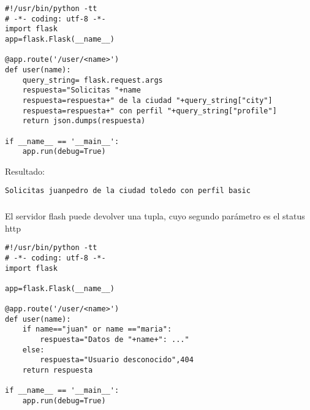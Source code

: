 \documentclass[ucs]{beamer}
\begin{document}
\begin{frame}[fragile]


  \begin{footnotesize}
  \begin{verbatim}
#!/usr/bin/python -tt
# -*- coding: utf-8 -*-
import flask
app=flask.Flask(__name__)

@app.route('/user/<name>') 
def user(name):
    query_string= flask.request.args
    respuesta="Solicitas "+name
    respuesta=respuesta+" de la ciudad "+query_string["city"]
    respuesta=respuesta+" con perfil "+query_string["profile"]
    return json.dumps(respuesta)

if __name__ == '__main__': 
    app.run(debug=True)
  \end{verbatim}
  \end{footnotesize}

Resultado:

  \begin{footnotesize}
  \begin{verbatim}
Solicitas juanpedro de la ciudad toledo con perfil basic
  \end{verbatim}
  \end{footnotesize}

\end{frame}


\begin{frame}[fragile]
\frametitle{}
El servidor flash puede devolver una tupla, cuyo segundo parámetro
es el status http

  \begin{footnotesize}
  \begin{verbatim}
#!/usr/bin/python -tt
# -*- coding: utf-8 -*-
import flask

app=flask.Flask(__name__)

@app.route('/user/<name>') 
def user(name):
    if name=="juan" or name =="maria":
        respuesta="Datos de "+name+": ..."
    else:
        respuesta="Usuario desconocido",404
    return respuesta

if __name__ == '__main__': 
    app.run(debug=True)
  \end{verbatim}
  \end{footnotesize}

\end{frame}
\end{document}
